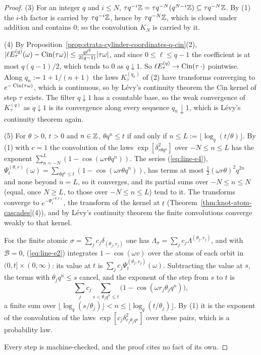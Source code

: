 \begin{proof}
(3) For an integer $q$ and $i \le N$, $\tau q^{-i}\mathbb{Z} = \tau q^{-N}(q^{N-i}\mathbb{Z}) \subseteq \tau q^{-N}\mathbb{Z}$.
By (1) the $i$-th factor is carried by $\tau q^{-i}\mathbb{Z}$, hence by $\tau q^{-N}\mathbb{Z}$, which is closed
under addition and contains $0$; so the convolution $K_N$ is carried by it.

(4) By Proposition~\ref{prop:strata-cylinder-coordinates-q-cin}(2),
$|\ell E^{(q)}_\tau(\omega) - \operatorname{Cin}(\tau\omega)| \le \frac{q\ell^2}{2(q - 1)}|\tau\omega|$, and since
$0 \le \ell \le q - 1$ the coefficient is at most $q(q - 1)/2$, which tends to $0$ as $q \downarrow 1$.
So $\ell E^{(q)}_\tau \to \operatorname{Cin}(\tau\,\cdot)$ pointwise. Along $q_n := 1 + 1/(n + 1)$ the laws
$K^{(q_n)}_\tau$ of (2) have transforms converging to $e^{-\operatorname{Cin}(\tau\omega)}$, which is continuous,
so by Lévy's continuity theorem the Cin kernel of step $\tau$ exists. The filter $q \downarrow 1$
has a countable base, so the weak convergence of $K^{(q)}_\tau$ as $q \downarrow 1$ is its
convergence along every sequence $q_n \downarrow 1$, which is Lévy's continuity theorem again.

(5) For $\theta > 0$, $t > 0$ and $n \in \mathbb{Z}$, $\theta q^n \le t$ if and only if
$n \le L := \lfloor\log_q(t/\theta)\rfloor$. By (1) with $c = 1$ the convolution of the laws
$\exp[\delta^2_{r\theta q^n}]$ over $-N \le n \le L$ has the exponent
$\sum_{n=-N}^{L}(1 - \cos(\omega r\theta q^n))$. The series (\ref{eq:line-e4}),
$\Psi^{(\theta,r)}_t(\omega) = \sum_{\theta q^n \le t}(1 - \cos(\omega r\theta q^n))$, has terms at most
$\tfrac12(\omega r\theta)^2q^{2n}$ and none beyond $n = L$, so it converges, and its partial sums over
$-N \le n \le N$ (equal, once $N \ge L$, to those over $-N \le n \le L$) tend to it. The transforms
converge to $e^{-\Psi^{(\theta,r)}_t}$, the transform of the kernel at $t$
(Theorem~\ref{thm:knot-atom-cascades}(4)), and by Lévy's continuity theorem the finite convolutions
converge weakly to that kernel.

For the finite atomic $\sigma = \sum_jc_j\delta_{(\theta_j,r_j)}$ one has
$\Lambda_\sigma = \sum_jc_j\Lambda^{(\theta_j,r_j)}$, and with $\mathcal{B} = 0$, (\ref{eq:line-e2}) integrates
$1 - \cos(\omega v)$ over the atoms of each orbit in $(0,t] \times (0,\infty)$: its value at $t$ is
$\sum_jc_j\Psi^{(\theta_j,r_j)}_t(\omega)$. Subtracting the value at $s$, the terms with
$\theta_jq^n \le s$ cancel, and the exponent of the step from $s$ to $t$ is
\[
  \sum_jc_j\sum_{s < \theta_jq^n \le t}\bigl(1 - \cos(\omega r_j\theta_jq^n)\bigr),
\]
a finite sum over $\lfloor\log_q(s/\theta_j)\rfloor < n \le \lfloor\log_q(t/\theta_j)\rfloor$. By (1)
it is the exponent of the convolution of the laws $\exp[c_j\delta^2_{r_j\theta_jq^n}]$ over these
pairs, which is a probability law.

Every step is machine-checked, and the proof cites no fact of its own.
\end{proof}

